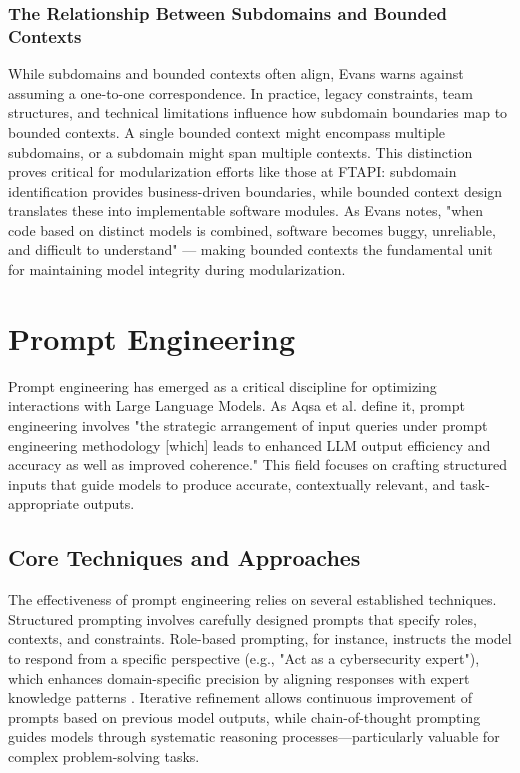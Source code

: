 \subsubsection{The Relationship Between Subdomains and Bounded Contexts}
While subdomains and bounded contexts often align, Evans \autocite[]{Evans2003} warns against assuming a one-to-one correspondence. In practice, legacy constraints, team structures, and technical limitations influence how subdomain boundaries map to bounded contexts. A single bounded context might encompass multiple subdomains, or a subdomain might span multiple contexts.
This distinction proves critical for modularization efforts like those at FTAPI: subdomain identification provides business-driven boundaries, while bounded context design translates these into implementable software modules. As Evans notes, "when code based on distinct models is combined, software becomes buggy, unreliable, and difficult to understand" \autocite[p.~271]{Evans2003}— making bounded contexts the fundamental unit for maintaining model integrity during modularization.

\section{Prompt Engineering}
Prompt engineering has emerged as a critical discipline for optimizing interactions with Large Language Models. As Aqsa et al. \autocite[]{promptAqsa} define it, prompt engineering involves "the strategic arrangement of input queries under prompt engineering methodology [which] leads to enhanced LLM output efficiency and accuracy as well as improved coherence." This field focuses on crafting structured inputs that guide models to produce accurate, contextually relevant, and task-appropriate outputs.

\subsection{Core Techniques and Approaches}
The effectiveness of prompt engineering relies on several established techniques. Structured prompting involves carefully designed prompts that specify roles, contexts, and constraints. Role-based prompting, for instance, instructs the model to respond from a specific perspective (e.g., "Act as a cybersecurity expert"), which enhances domain-specific precision by aligning responses with expert knowledge patterns \autocite[]{promptAqsa}. Iterative refinement allows continuous improvement of prompts based on previous model outputs, while chain-of-thought prompting guides models through systematic reasoning processes—particularly valuable for complex problem-solving tasks.

